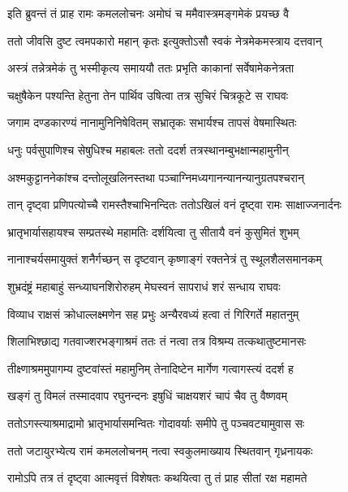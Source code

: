 \twolineshloka
{इति ब्रुवन्तं तं प्राह रामः कमललोचनः}
{अमोघं च ममैवास्त्रमङ्गमेकं प्रयच्छ वै} %

\twolineshloka
{ततो जीवसि दुष्ट त्वमपकारो महान् कृतः}
{इत्युक्तोऽसौ स्वकं नेत्रमेकमस्त्राय दत्तवान्} %

\twolineshloka
{अस्त्रं तन्नेत्रमेकं तु भस्मीकृत्य समाययौ}
{ततः प्रभृति काकानां सर्वेषामेकनेत्रता} %

\twolineshloka
{चक्षुषैकेन पश्यन्ति हेतुना तेन पार्थिव}
{उषित्वा तत्र सुचिरं चित्रकूटे स राघवः} %

\twolineshloka
{जगाम दण्डकारण्यं नानामुनिनिषेवितम्}
{सभ्रातृकः सभार्यश्च तापसं वेषमास्थितः} %

\twolineshloka
{धनुः पर्वसुपाणिश्च सेषुधिश्च महाबलः}
{ततो ददर्श तत्रस्थानम्बुभक्षान्महामुनीन्} %

\twolineshloka
{अश्मकुट्टाननेकांश्च दन्तोलूखलिनस्तथा}
{पञ्चाग्निमध्यगानन्यानन्यानुग्रतपश्चरान्} %

\twolineshloka
{तान् दृष्ट्वा प्रणिपत्योच्चै रामस्तैश्चाभिनन्दितः}
{ततोऽखिलं वनं दृष्ट्वा रामः साक्षाज्जनार्दनः} %

\twolineshloka
{भ्रातृभार्यासहायश्च सम्प्रतस्थे महामतिः}
{दर्शयित्वा तु सीतायै वनं कुसुमितं शुभम्} %

\twolineshloka
{नानाश्चर्यसमायुक्तं शनैर्गच्छन् स दृष्टवान्}
{कृष्णाङ्गं रक्तनेत्रं तु स्थूलशैलसमानकम्} %

\twolineshloka
{शुभ्रदंष्ट्रं महाबाहुं सन्ध्याघनशिरोरुहम्}
{मेघस्वनं सापराधं शरं सन्धाय राघवः} %

\twolineshloka
{विव्याध राक्षसं क्रोधाल्लक्ष्मणेन सह प्रभुः}
{अन्यैरवध्यं हत्वा तं गिरिगर्ते महातनुम्} %

\twolineshloka
{शिलाभिश्छाद्य गतवाज्शरभङ्गाश्रमं ततः}
{तं नत्वा तत्र विश्रम्य तत्कथातुष्टमानसः} %

\twolineshloka
{तीक्ष्णाश्रममुपागम्य दुष्टवांस्तं महामुनिम्}
{तेनादिष्टेन मार्गेण गत्वागस्त्यं ददर्श ह} %

\twolineshloka
{खङ्गं तु विमलं तस्मादवाप रघुनन्दनः}
{इषुधिं चाक्षयशरं चापं चैव तु वैष्णवम्} %

\twolineshloka
{ततोऽगस्त्याश्रमाद्रामो भ्रातृभार्यासमन्वितः}
{गोदावर्याः समीपे तु पञ्चवट्यामुवास सः} %

\twolineshloka
{ततो जटायुरभ्येत्य रामं कमललोचनम्}
{नत्वा स्वकुलमाख्याय स्थितवान् गृध्रनायकः} %

\twolineshloka
{रामोऽपि तत्र तं दृष्ट्वा आत्मवृत्तं विशेषतः}
{कथयित्वा तु तं प्राह सीतां रक्ष महामते} %

